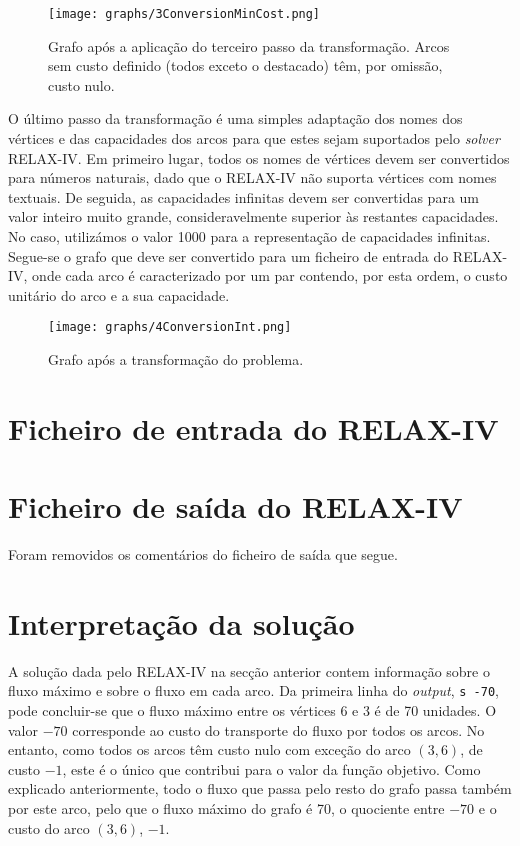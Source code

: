 \documentclass[12pt, a4paper, titlepage]{article}
\begin{document}
\begin{figure}[H]
    \centering
    \texttt{[image: graphs/3ConversionMinCost.png]}
    \caption{ \onehalfspacing
        Grafo após a aplicação do terceiro passo da transformação. Arcos sem custo definido (todos
        exceto o destacado) têm, por omissão, custo nulo.}
    \label{3conversion-graph}
\end{figure}

O último passo da transformação é uma simples adaptação dos nomes dos vértices e das capacidades dos
arcos para que estes sejam suportados pelo \emph{solver} RELAX-IV. Em primeiro lugar, todos os nomes
de vértices devem ser convertidos para números naturais, dado que o RELAX-IV não suporta vértices
com nomes textuais. De seguida, as capacidades infinitas devem ser convertidas para um valor inteiro
muito grande, consideravelmente superior às restantes capacidades. No caso, utilizámos o valor 1000
para a representação de capacidades infinitas. Segue-se o grafo que deve ser convertido para um
ficheiro de entrada do RELAX-IV, onde cada arco é caracterizado por um par contendo, por esta ordem,
o custo unitário do arco e a sua capacidade.

\begin{figure}[H]
    \centering
    \texttt{[image: graphs/4ConversionInt.png]}
    \caption{Grafo após a transformação do problema.}
    \label{4conversion-graph}
\end{figure}

\section{Ficheiro de entrada do RELAX-IV}


\section{Ficheiro de saída do RELAX-IV}
Foram removidos os comentários do ficheiro de saída que segue.


\section{Interpretação da solução}

A solução dada pelo RELAX-IV na secção anterior contem informação sobre o fluxo máximo e sobre o
fluxo em cada arco. Da primeira linha do \emph{output}, \texttt{s -70}, pode concluir-se que o fluxo
máximo entre os vértices 6 e 3 é de 70 unidades. O valor $-70$ corresponde ao custo do transporte
do fluxo por todos os arcos. No entanto, como todos os arcos têm custo nulo com exceção do arco
$(3, 6)$, de custo $-1$, este é o único que contribui para o valor da função objetivo. Como
explicado anteriormente, todo o fluxo que passa pelo resto do grafo passa também por este arco, pelo
que o fluxo máximo do grafo é 70, o quociente entre $-70$ e o custo do arco $(3, 6)$, $-1$.
\end{document}

